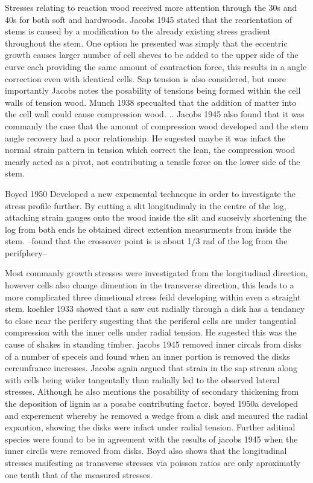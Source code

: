 \documentclass{article}
\begin{document}
Stresses relating to reaction wood received more attention through the 30s and
40s for both soft and hardwoods. Jacobs 1945 stated that the reorientation of
stems is caused by a modification to the already existing stress gradient
throughout the stem. One option he presented was simply that the eccentric
growth causes larger number of cell sheves to be added to the upper side of the
curve each providing the same amount of contraction force, this results in a
angle correction even with identical cells. Sap tension is also considered, but
more importantly Jacobs notes the posability of tensions being formed within the
cell walls of tension wood.
Munch 1938 specualted that the addition of matter into the cell wall could cause
compression wood. ..
Jacobs 1945 also found that it was commanly the case that the amount of
compression wood developed and the stem angle recovery had a poor relationship.
He sugested maybe it was infact the normal strain pattern in tension which
correct the lean, the compression wood mearly acted as a pivot, not contributing
a tensile force on the lower side of the stem.

Boyed 1950 Developed a new expemental techneque in order to investigate the
stress profile further. By cutting a slit longitudinaly in the centre of the
log, attaching strain gauges onto the wood inside the slit and sucseivly
shortening the log from both ends he obtained direct extention measurments from
inside the stem. --found that the crossover point is is about 1/3 rad of the log
from the perifphery--

Most commanly growth stresses were investigated from the longitudinal direction,
however cells also change dimention in the transverse direction, this leads to a
more complicated three dimetional stress feild developing within even a straight
stem.
koehler 1933 showed that a saw cut radially through a disk has a tendancy to
close near the perifery sugesting that the periferal cells are under tangential
compression with the inner cells under radial tension. He sugested this was the
cause of shakes in standing timber.
jacobs 1945 removed inner circals from disks of a number of speceis and found
when an inner portion is removed the disks cercunfrance incresses. Jacobs again
argued that strain in the sap stream along with cells being wider tangentally
than radially led to the observed lateral stresses. Although he also mentions
the posability of secondary thickening from the deposition of lignin as a
posabe contributing factor.
boyed 1950a developed and experement whereby he removed a wedge from a disk and
meaured the radial expantion, showing the disks were infact under radial
tension. Further aditinal species were found to be in agreement with the results
of jacobs 1945 when the inner circils were removed from disks. Boyd also shows
that the longitudinal stresses maifesting as transverse stresses via poisson
ratios are only aproximatly one tenth that of the measured stresses.
\end{document}
